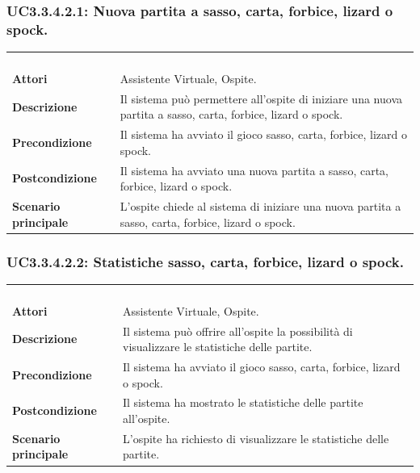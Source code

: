 \subsubsection{UC3.3.4.2.1: Nuova partita a sasso, carta, forbice, lizard o spock.}
\label{UC3.3.4.2.1}
\begin{longtable}{l|p{10cm}}
\rowcolor[gray]{0.8} \multicolumn{2}{c}{} \\
\rowcolor[gray]{0.8} \multicolumn{2}{c}{\textbf{UC3.3.4.2.1 - Nuova partita a sasso, carta, forbice, lizard o spock.}} \\
\rowcolor[gray]{0.8} \multicolumn{2}{c}{} \\
\hline
&\\
\textbf{Attori} & Assistente Virtuale, Ospite.\\[7pt]
\textbf{Descrizione} & Il sistema può permettere all'ospite di iniziare una nuova partita a sasso, carta, forbice, lizard o spock.\\[7pt]
\textbf{Precondizione} & Il sistema ha avviato il gioco sasso, carta, forbice, lizard o spock.\\[7pt]
\textbf{Postcondizione} & Il sistema ha avviato una nuova partita a sasso, carta, forbice, lizard o spock.\\[7pt]
\textbf{Scenario principale} &L'ospite chiede al sistema di iniziare una nuova partita a sasso, carta, forbice, lizard o spock.\\[7pt]\hline
\end{longtable}

\subsubsection{UC3.3.4.2.2: Statistiche sasso, carta, forbice, lizard o spock.}
\label{UC3.3.4.2.2}
\begin{longtable}{l|p{10cm}}
\rowcolor[gray]{0.8} \multicolumn{2}{c}{} \\
\rowcolor[gray]{0.8} \multicolumn{2}{c}{\textbf{UC3.3.4.2.2 - Statistiche sasso, carta, forbice, lizard o spock.}} \\
\rowcolor[gray]{0.8} \multicolumn{2}{c}{} \\
\hline
&\\
\textbf{Attori} & Assistente Virtuale, Ospite.\\[7pt]
\textbf{Descrizione} & Il sistema può offrire all'ospite la possibilità di visualizzare le statistiche delle partite.\\[7pt]
\textbf{Precondizione} & Il sistema ha avviato il gioco sasso, carta, forbice, lizard o spock.\\[7pt]
\textbf{Postcondizione} & Il sistema ha mostrato le statistiche delle partite all'ospite.\\[7pt]
\textbf{Scenario principale} &L'ospite ha richiesto di visualizzare le statistiche delle partite.\\[7pt]\hline
\end{longtable}

